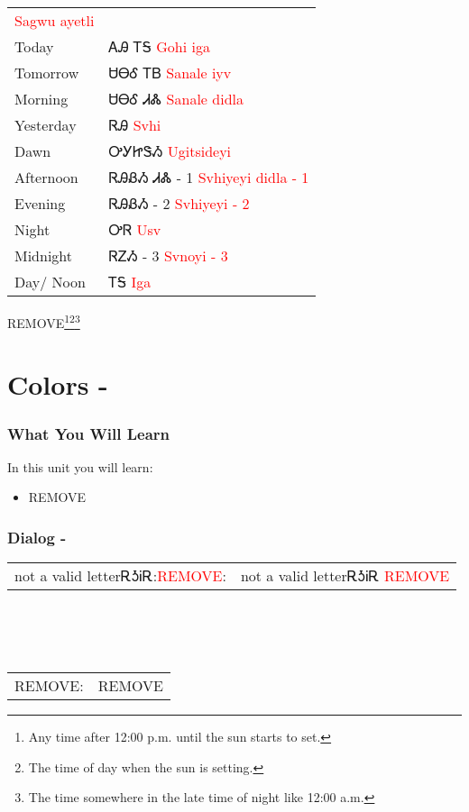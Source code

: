 \begin{tabular}{p{3cm} p{11cm}}
 \newline \textcolor{red}{Sagwu ayetli}\\
Today & ᎪᎯ ᎢᎦ 
 \newline \textcolor{red}{Gohi iga}\\
Tomorrow & ᏌᎾᎴ ᎢᏴ 
 \newline \textcolor{red}{Sanale iyv}\\
Morning & ᏌᎾᎴ ᏗᏜ 
 \newline \textcolor{red}{Sanale didla}\\
Yesterday & ᏒᎯ 
 \newline \textcolor{red}{Svhi}\\
Dawn & ᎤᎩᏥᏕᏱ 
 \newline \textcolor{red}{Ugitsideyi}\\
Afternoon & ᏒᎯᏰᏱ ᏗᏜ - 1 
 \newline \textcolor{red}{Svhiyeyi didla - 1}\\
Evening & ᏒᎯᏰᏱ - 2 
 \newline \textcolor{red}{Svhiyeyi - 2}\\
Night & ᎤᏒ 
 \newline \textcolor{red}{Usv}\\
Midnight & ᏒᏃᏱ - 3 
 \newline \textcolor{red}{Svnoyi - 3}\\
Day/ Noon & ᎢᎦ 
 \newline \textcolor{red}{Iga}\\
\end{tabular}

REMOVE\footnote{Any time after 12:00 p.m. until the sun starts to set.}\footnote{The time of day when the sun is setting.}\footnote{The time somewhere in the late time of night like 12:00 a.m.}\cite{walcpp47}
\index{}
\chapter{Colors - }
\subsection{What You Will Learn}
In this unit you will learn:
\begin{itemize}
\item REMOVE
\end{itemize}\newpage

\subsection{Dialog - }
\begin{tabular}{p{2cm} p{11cm}}
not a valid letterᎡᎼᎥᎡ:\newline \textcolor{red}{REMOVE}: & not a valid letterᎡᎼᎥᎡ 
\newline\textcolor{red}{REMOVE}\\
\end{tabular}
\\
\\
\\
\noindent\begin{tabular}{p{2cm} p{11cm}}REMOVE: & REMOVE\\
\end{tabular}
